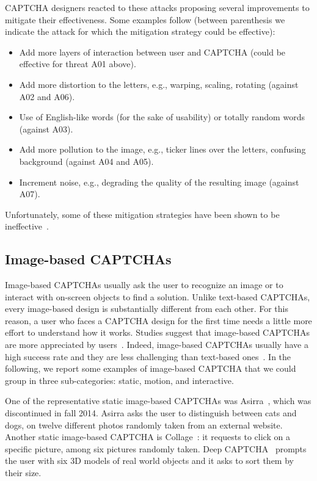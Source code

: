 \documentclass[conference]{IEEEtran}
\begin{document}
CAPTCHA designers reacted to these attacks proposing several improvements to mitigate their effectiveness.
Some examples follow (between parenthesis we indicate the attack for which the mitigation strategy could be effective):
\begin{itemize}
\item Add more layers of interaction between user and CAPTCHA (could be effective for threat A01 above).
\item Add more distortion to the letters, e.g., warping, scaling, rotating (against A02 and A06).
\item Use of English-like words (for the sake of usability) or totally random words (against A03).
  \item Add more pollution to the image, e.g., ticker lines over the letters, confusing background (against A04 and A05).
  \item Increment noise, e.g., degrading the quality of the resulting image (against A07).
\end{itemize}
Unfortunately, some of these mitigation strategies have been shown to be ineffective~\cite{ElAhmad:2010:RNC:1752046.1752052,bursztein2014end}.

\subsection{Image-based CAPTCHAs}
\label{imagebasedcompetitors}
\label{imagebasedthreats}
Image-based CAPTCHAs usually ask the user to recognize an image or to  interact with on-screen objects 
to find a solution.
Unlike text-based CAPTCHAs, every image-based design is substantially different from each other. 
For this reason, a user who faces a CAPTCHA design for the first time needs a little more effort to understand how it works. Studies suggest that image-based CAPTCHAs are more appreciated by users~\cite{gao2010novel}. 
Indeed, image-based CAPTCHAs usually have a high success rate and they are less challenging than text-based ones~\cite{nejati2014deepCAPTCHA}.
In the following, we report some examples of image-based CAPTCHA that we could group in three sub-categories: static, motion, and interactive. 

One of the representative static image-based CAPTCHAs was {Asirra}~\cite{elson2007asirra}, which was discontinued in fall 2014. Asirra asks the user to distinguish between cats and dogs, on twelve different photos randomly taken from an external website. Another static image-based CAPTCHA is Collage~\cite{shirali2008advanced}: it requests to click on a specific picture, among six pictures randomly taken.
{Deep CAPTCHA}~\cite{nejati2014deepCAPTCHA} prompts the user with six 3D models of real world objects and it asks to sort them by their size. 
\end{document}
